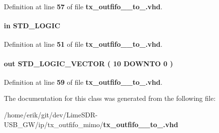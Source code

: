 Definition at line {\bf 57} of file {\bf tx\+\_\+outfifo\+\_\+\_\+to\+\_.\+vhd}.

\paragraph[{wrreq}]{ {\bfseries \textcolor{keywordflow}{in}\textcolor{vhdlchar}{ }} {\bfseries \textcolor{comment}{S\+T\+D\+\_\+\+L\+O\+G\+IC}\textcolor{vhdlchar}{ }} \hspace{0.3cm}{\ttfamily [Port]}}\label{classtx__outfifo__16__to__32_ae7e02414aa516307988efa17ff21d58c}


Definition at line {\bf 51} of file {\bf tx\+\_\+outfifo\+\_\+\_\+to\+\_.\+vhd}.

\paragraph[{wrusedw}]{ {\bfseries \textcolor{keywordflow}{out}\textcolor{vhdlchar}{ }} {\bfseries \textcolor{comment}{S\+T\+D\+\_\+\+L\+O\+G\+I\+C\+\_\+\+V\+E\+C\+T\+OR}\textcolor{vhdlchar}{ }\textcolor{vhdlchar}{(}\textcolor{vhdlchar}{ }\textcolor{vhdlchar}{ } \textcolor{vhdldigit}{10} \textcolor{vhdlchar}{ }\textcolor{keywordflow}{D\+O\+W\+N\+TO}\textcolor{vhdlchar}{ }\textcolor{vhdlchar}{ } \textcolor{vhdldigit}{0} \textcolor{vhdlchar}{ }\textcolor{vhdlchar}{)}\textcolor{vhdlchar}{ }} \hspace{0.3cm}{\ttfamily [Port]}}\label{classtx__outfifo__16__to__32_a3d1253abed2d78a649c813c97cfc950e}


Definition at line {\bf 59} of file {\bf tx\+\_\+outfifo\+\_\+\_\+to\+\_.\+vhd}.



The documentation for this class was generated from the following file\+:\begin{DoxyCompactItemize}
\item 
/home/erik/git/dev/\+Lime\+S\+D\+R-\/\+U\+S\+B\+\_\+\+G\+W/ip/tx\+\_\+outfifo\+\_\+mimo/{\bf tx\+\_\+outfifo\+\_\+\_\+to\+\_.\+vhd}\end{DoxyCompactItemize}
